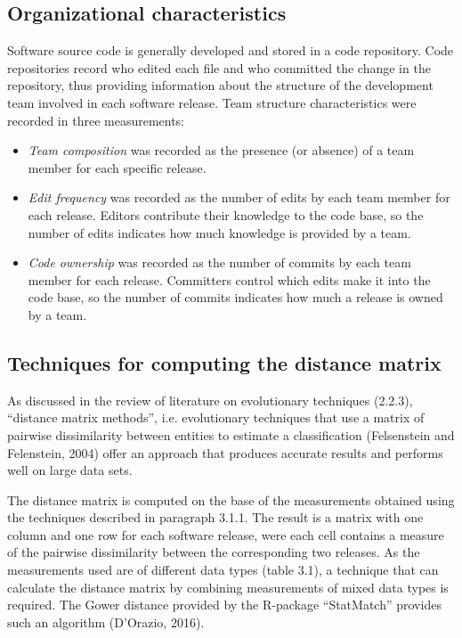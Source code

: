 \subsection{Organizational characteristics}
Software source code is generally developed and stored in a code repository. Code repositories record who edited each file and who committed the change in the repository, thus providing information about the structure of the development team involved in each software release. Team structure characteristics were recorded in three measurements:

\begin{itemize}
\item{\textit{Team composition} was recorded as the presence (or absence) of a team member for each specific release.}
  
\item{\textit{Edit frequency} was recorded as the number of edits by each team member for each release. Editors contribute their knowledge to the code base, so the number of edits indicates how much knowledge is provided by a team.}
  
\item{\textit{Code ownership} was recorded as the number of commits by each team member for each release. Committers control which edits make it into the code base, so the number of commits indicates how much a release is owned by a team.}
\end{itemize}

\subsection{Techniques for computing the distance matrix}
As discussed in the review of literature on evolutionary techniques (2.2.3), “distance matrix methods”, i.e. evolutionary techniques that use a matrix of pairwise dissimilarity between entities to estimate a classification (Felsenstein and Felenstein, 2004) offer an approach that produces accurate results and performs well on large data sets.

The distance matrix is computed on the base of the measurements obtained using the techniques described in paragraph 3.1.1. The result is a matrix with one column and one row for each software release, were each cell contains a measure of the pairwise dissimilarity between the corresponding two releases. As the measurements used are of different data types (table 3.1), a technique that can calculate the distance matrix by combining measurements of mixed data types is required. The Gower distance provided by the R-package “StatMatch” provides such an algorithm (D'Orazio, 2016).


